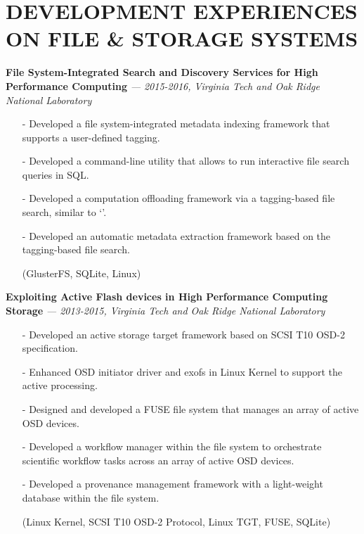 \section{DEVELOPMENT EXPERIENCES ON FILE \& STORAGE SYSTEMS} 
\vspace{0.03in}
  {\bf File System-Integrated Search and Discovery Services for High Performance Computing}
   {\it \footnotesize --- 2015-2016, Virginia Tech and Oak Ridge National Laboratory}
   \begin{itemize}[leftmargin=*]
    \setlength\itemsep{-0.02in}
    \item[-] Developed a file system-integrated metadata indexing framework
	     that supports a user-defined tagging.
    \item[-] Developed a command-line utility that allows to run interactive file search queries
             in SQL.
    \item[-] Developed a computation offloading framework via a tagging-based file search,
             similar to `'.
    \item[-] Developed an automatic metadata
	     extraction framework based on the tagging-based file search.
    \item[] {\small(GlusterFS, SQLite, Linux)}
   \end{itemize}
  \vspace{-0.15in}
  {\bf Exploiting Active Flash devices in High Performance Computing Storage}
    {\it \footnotesize --- 2013-2015, Virginia Tech and Oak Ridge National Laboratory}
    \begin{itemize}[leftmargin=*]
    \setlength\itemsep{-0.02in}
    \item[-] Developed an active storage target framework based on SCSI T10 OSD-2
    specification.
    \item[-] Enhanced OSD initiator driver and exofs in Linux Kernel to support the active
    processing.
    \item[-] Designed and developed a FUSE file system that manages an array of active OSD devices.
    \item[-] Developed a workflow manager within the file system to orchestrate scientific
    workflow tasks across an array of active OSD devices.
    \item[-] Developed a provenance management framework with a light-weight database
             within the file system.
    \item[] {\small(Linux Kernel, SCSI T10 OSD-2 Protocol, Linux TGT, FUSE, SQLite)}
    \end{itemize}
